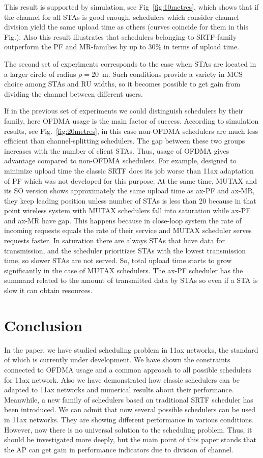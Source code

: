 This result is supported by simulation, see Fig~\ref{fig:10metres}, which shows that if the channel for all STAs is good enough, schedulers which consider channel division yield the same upload time as others (curves coincide for them in this Fig.). Also this result illustrates that schedulers belonging to SRTF-family outperform the PF and MR-families by up to 30\% in terms of upload time. 

The second set of experiments corresponds to the case when STAs are located in a larger circle of radius $\rho = 20$~m.
Such conditions provide a variety in MCS choice among STAs and RU widths, so it becomes possible to get gain from dividing the channel between different users.

If in the previous set of experiments we could distinguish schedulers by their family, here OFDMA usage is the main factor of success.
According to simulation results, see Fig.~\ref{fig:20metres}, in this case non-OFDMA schedulers are  much less efficient than channel-splitting schedulers. 
The gap between these two groups increases with the number of client STAs. 
Thus, usage of OFDMA gives advantage compared to non-OFDMA schedulers. 
For example, designed to minimize upload time the classic SRTF does its job worse than 11ax adaptation of PF which was not developed for this purpose.
At the same time, MUTAX and its SO version shows approximately the same upload time as ax-PF and ax-MR, they keep leading position unless number of STAs is less than 20 because in that point wireless system with MUTAX schedulers fall into saturation while ax-PF and ax-MR have gap. This happens because in close-loop system the rate of incoming requests equals the rate of their service and MUTAX scheduler serves requests faster. In saturation there are always STAs that have data for transmission, and the scheduler prioritizes STAs with the lowest transmission time, so slower STAs are not served. So, total upload time starts to grow significantly in the case of MUTAX schedulers. The ax-PF scheduler has the summand related to the amount of transmitted data by STAs so even if a STA is slow it can obtain resources.     

\section{Conclusion}
\label{sec:conclusion}

In the paper, we have studied scheduling problem in 11ax networks, the standard of which is currently under development. We have shown the constraints connected to OFDMA usage and a common approach to all possible schedulers for 11ax network.
Also we have demonstrated how classic schedulers can be adapted to 11ax networks and numerical results about their performance. 
Meanwhile, a new family of schedulers based on traditional SRTF scheduler has been introduced. 
We can admit that now several possible schedulers can be used in 11ax networks. 
They are showing different performance in various conditions. 
However, now there is no universal solution to the scheduling problem.
Thus, it should be investigated more deeply, but the main point of this paper stands that the AP can get gain in performance indicators due to division of channel.


 

